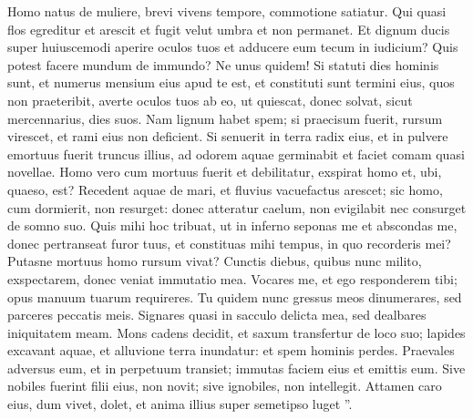 \begin{biblechapter}
\begin{biblechapter}
\begin{biblechapter}
\begin{biblechapter}
\begin{biblechapter}
\begin{biblechapter}
\begin{biblechapter}
\begin{biblechapter}
\begin{biblechapter}
\begin{biblechapter}
\begin{biblechapter}
\begin{biblechapter}
\begin{biblechapter}
\begin{biblechapter}
\verse Homo natus de muliere,
 brevi vivens tempore, commotione satiatur.
 \verse Qui quasi flos egreditur et arescit
 et fugit velut umbra et non permanet.
 \verse Et dignum ducis super huiuscemodi aperire oculos tuos
 et adducere eum tecum in iudicium?
 \verse Quis potest facere mundum de immundo?
 Ne unus quidem!
 \verse Si statuti dies hominis sunt,
 et numerus mensium eius apud te est,
 et constituti sunt termini eius, quos non praeteribit,
 \verse averte oculos tuos ab eo, ut quiescat,
 donec solvat, sicut mercennarius, dies suos.
 \verse Nam lignum habet spem;
 si praecisum fuerit, rursum virescet,
 et rami eius non deficient.
 \verse Si senuerit in terra radix eius,
 et in pulvere emortuus fuerit truncus illius,
 \verse ad odorem aquae germinabit
 et faciet comam quasi novellae.
 \verse Homo vero cum mortuus fuerit et debilitatur,
 exspirat homo et, ubi, quaeso, est?
 \verse Recedent aquae de mari,
 et fluvius vacuefactus arescet;
 \verse sic homo, cum dormierit, non resurget:
 donec atteratur caelum, non evigilabit
 nec consurget de somno suo.
 \verse Quis mihi hoc tribuat, ut in inferno seponas me
 et abscondas me, donec pertranseat furor tuus,
 et constituas mihi tempus, in quo recorderis mei?
 \verse Putasne mortuus homo rursum vivat?
 Cunctis diebus, quibus nunc milito,
 exspectarem, donec veniat immutatio mea.
 \verse Vocares me, et ego responderem tibi;
 opus manuum tuarum requireres.
 \verse Tu quidem nunc gressus meos dinumerares,
 sed parceres peccatis meis.
 \verse Signares quasi in sacculo delicta mea,
 sed dealbares iniquitatem meam.
 \verse Mons cadens decidit,
 et saxum transfertur de loco suo;
 \verse lapides excavant aquae,
 et alluvione terra inundatur:
 et spem hominis perdes.
 \verse Praevales adversus eum, et in perpetuum transiet;
 immutas faciem eius et emittis eum.
 \verse Sive nobiles fuerint filii eius, non novit;
 sive ignobiles, non intellegit.
 \verse Attamen caro eius, dum vivet, dolet,
 et anima illius super semetipso luget ”.
 

\end{biblechapter}
\end{biblechapter}
\end{biblechapter}
\end{biblechapter}
\end{biblechapter}
\end{biblechapter}
\end{biblechapter}
\end{biblechapter}
\end{biblechapter}
\end{biblechapter}
\end{biblechapter}
\end{biblechapter}
\end{biblechapter}
\end{biblechapter}

